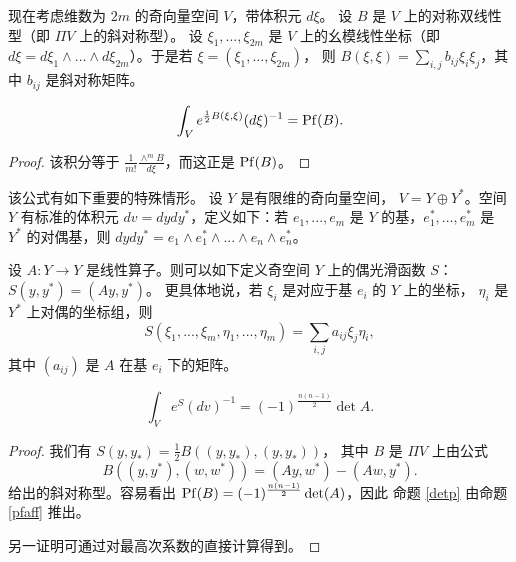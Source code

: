 现在考虑维数为 $2m$ 的奇向量空间 $V$，带体积元 $d\xi$。
设 $B$ 是 $V$ 上的对称双线性型（即
$\Pi V$ 上的斜对称型）。
设 $\xi_1,...,\xi_{2m}$ 是 $V$ 上的幺模线性坐标（即
$d\xi=d\xi_1\wedge...\wedge d\xi_{2m}$）。于是若 $\xi=(\xi_1,...,\xi_{2m})$，
则 $B(\xi,\xi)=\sum_{i,j}b_{ij}\xi_i\xi_j$，其中 $b_{ij}$ 是斜对称矩阵。

\begin{proposition}\label{pfaff}
$$
\int_V e^{\frac{1}{2}B(\xi,\xi)}(d\xi)^{-1}={\rm Pf}(B).
$$
\end{proposition}

\begin{proof}
该积分等于 $\frac{1}{m!}\frac{\wedge^m B}{d\xi}$，而这正是 ${\rm Pf}(B)$。
\end{proof}

该公式有如下重要的特殊情形。
设 $Y$ 是有限维的奇向量空间，
$V=Y\oplus Y^*$。空间 $Y$ 有标准的体积元
$dv=dydy^*$，定义如下：若
$e_1,...,e_m$ 是 $Y$ 的基，$e_1^*,...,e_m^*$
是 $Y^*$ 的对偶基，则 $dydy^*=e_1\wedge e_1^*\wedge...\wedge e_n\wedge e_n^*$。

设 $A: Y\to Y$ 是线性算子。则可以如下定义奇空间 $Y$ 上的偶光滑函数
$S$：$S(y,y^*)=(Ay,y^*)$。
更具体地说，若 $\xi_i$ 是对应于基 $e_i$ 的 $Y$ 上的坐标，
$\eta_i$ 是 $Y^*$ 上对偶的坐标组，则
$$
S(\xi_1,...,\xi_m,\eta_1,...,\eta_m)=\sum_{i,j} a_{ij}\xi_j\eta_i,
$$
其中 $(a_{ij})$ 是 $A$ 在基 $e_i$ 下的矩阵。

\begin{proposition}\label{detp}
$$
\int_V e^S(dv)^{-1}=(-1)^{\frac{n(n-1)}{2}}\det A.
$$
\end{proposition}

\begin{proof} 我们有 $S(y,y_*)=\frac{1}{2}B((y,y_*),(y,y_*))$，
其中 $B$ 是 $\Pi V$ 上由公式
$$
B((y,y^*),(w,w^*))=(Ay,w^*)-(Aw,y^*).
$$
给出的斜对称型。容易看出 ${\rm Pf}(B)=(-1)^{\frac{n(n-1)}{2}}\det(A)$，因此
命题 \ref{detp} 由命题 \ref{pfaff} 推出。

另一证明可通过对最高次系数的直接计算得到。
\end{proof}



